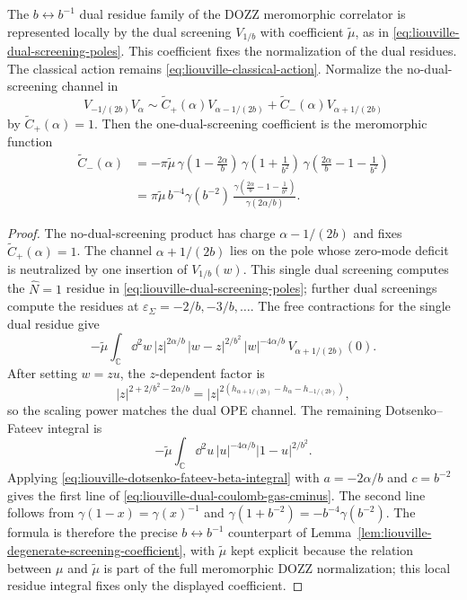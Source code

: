 \begin{lemma}
\label{lem:liouville-dual-screening-coefficient}
The \(b\leftrightarrow b^{-1}\) dual residue family of the DOZZ meromorphic
correlator is represented locally by the dual screening \(V_{1/b}\) with
coefficient \(\widetilde\mu\), as in
\eqref{eq:liouville-dual-screening-poles}.  This coefficient fixes the
normalization of the dual residues.  The classical action remains
\eqref{eq:liouville-classical-action}.  Normalize the no-dual-screening
channel in
\[
  V_{-1/(2b)}V_\alpha
  \sim
  \widetilde C_+(\alpha)V_{\alpha-1/(2b)}
  +
  \widetilde C_-(\alpha)V_{\alpha+1/(2b)}
\]
by \(\widetilde C_+(\alpha)=1\).  Then the one-dual-screening coefficient is
the meromorphic function
\begin{equation}
\begin{aligned}
  \widetilde C_-(\alpha)
  &=
  -\pi\widetilde\mu\,
  \gamma\!\left(1-\frac{2\alpha}{b}\right)\,
  \gamma\!\left(1+\frac1{b^2}\right)\,
  \gamma\!\left(\frac{2\alpha}{b}-1-\frac1{b^2}\right)
  \\
  &=
  \pi\widetilde\mu\,b^{-4}\gamma(b^{-2})\,
  \frac{
    \gamma\!\left(\frac{2\alpha}{b}-1-\frac1{b^2}\right)}
       {\gamma(2\alpha/b)} .
\end{aligned}
  \label{eq:liouville-dual-coulomb-gas-cminus}
\end{equation}
\end{lemma}

\begin{proof}
The no-dual-screening product has charge \(\alpha-1/(2b)\) and fixes
\(\widetilde C_+(\alpha)=1\).  The channel
\(\alpha+1/(2b)\) lies on the pole whose zero-mode deficit is neutralized by
one insertion of \(V_{1/b}(w)\).  This single dual screening computes the
\(\widehat N=1\) residue in
\eqref{eq:liouville-dual-screening-poles}; further dual screenings compute
the residues at \(\varepsilon_\Sigma=-2/b,-3/b,\ldots\).  The free
contractions for the single dual residue give
\[
  -\widetilde\mu\int_{\mathbb C}\dd^2 w\,
  |z|^{2\alpha/b}\,|w-z|^{2/b^2}\,|w|^{-4\alpha/b}\,
  V_{\alpha+1/(2b)}(0).
\]
After setting \(w=zu\), the \(z\)-dependent factor is
\[
  |z|^{2+2/b^2-2\alpha/b}
  =
  |z|^{2(h_{\alpha+1/(2b)}-h_\alpha-h_{-1/(2b)})},
\]
so the scaling power matches the dual OPE channel.  The remaining
Dotsenko--Fateev integral is
\[
  -\widetilde\mu
  \int_{\mathbb C}\dd^2u\,
  |u|^{-4\alpha/b}|1-u|^{2/b^2}.
\]
Applying \eqref{eq:liouville-dotsenko-fateev-beta-integral} with
\(a=-2\alpha/b\) and \(c=b^{-2}\) gives the first line of
\eqref{eq:liouville-dual-coulomb-gas-cminus}.  The second line follows from
\(\gamma(1-x)=\gamma(x)^{-1}\) and
\(\gamma(1+b^{-2})=-b^{-4}\gamma(b^{-2})\).  The formula is therefore the
precise \(b\leftrightarrow b^{-1}\) counterpart of
Lemma~\ref{lem:liouville-degenerate-screening-coefficient}, with
\(\widetilde\mu\) kept explicit because the relation between \(\mu\) and
\(\widetilde\mu\) is part of the full meromorphic DOZZ normalization; this
local residue integral fixes only the displayed coefficient.
\end{proof}

